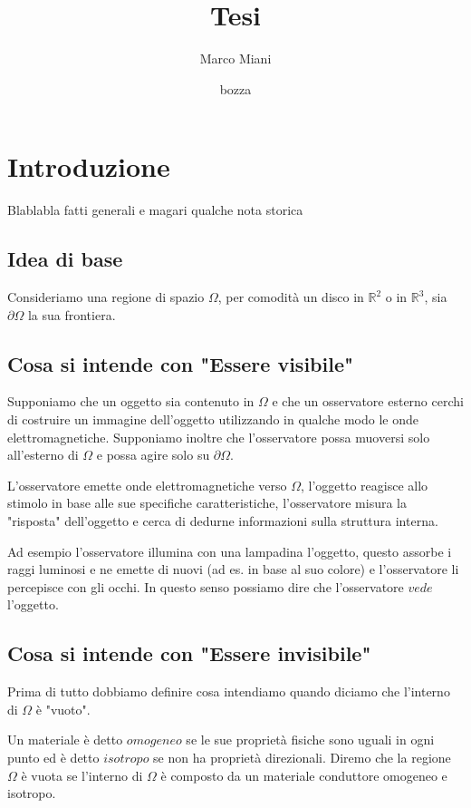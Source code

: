 \documentclass{book}
\title{Tesi}
\author{Marco Miani}
\date{bozza}
\newcommand{\bbR}{\mathbb{R}}
\begin{document}
\maketitle
\tableofcontents

\setlength{\parskip}{0.5em}
\setlength{\parindent}{0em}

\chapter{Introduzione}
Blablabla fatti generali e magari qualche nota storica




\section{Idea di base}
Consideriamo una regione di spazio $\Omega$, per comodità un disco in $\bbR^2$ o in $\bbR^3$, sia $\partial\Omega$ la sua frontiera.

\section{Cosa si intende con "Essere visibile"}

Supponiamo che un oggetto sia contenuto in $\Omega$ e che un osservatore esterno cerchi di costruire un immagine dell'oggetto utilizzando in qualche modo le onde elettromagnetiche. Supponiamo inoltre che l'osservatore possa muoversi solo all'esterno di $\Omega$ e possa agire solo su $\partial\Omega$.

L'osservatore emette onde elettromagnetiche verso $\Omega$, l'oggetto reagisce allo stimolo in base alle sue specifiche caratteristiche, l'osservatore misura la "risposta" dell'oggetto e cerca di dedurne informazioni sulla struttura interna.

Ad esempio l'osservatore illumina con una lampadina l'oggetto, questo assorbe i raggi luminosi e ne emette di nuovi (ad es. in base al suo colore) e l'osservatore li percepisce con gli occhi. In questo senso possiamo dire che l'osservatore $vede$ l'oggetto.

\section{Cosa si intende con "Essere invisibile"}
Prima di tutto dobbiamo definire cosa intendiamo quando diciamo che l'interno di $\Omega$ è "vuoto".

Un materiale è detto $omogeneo$ se le sue proprietà fisiche sono uguali in ogni punto ed è detto $isotropo$ se non ha proprietà direzionali. Diremo che la regione $\Omega$ è vuota se l'interno di $\Omega$ è composto da un materiale conduttore omogeneo e isotropo.
\end{document}
